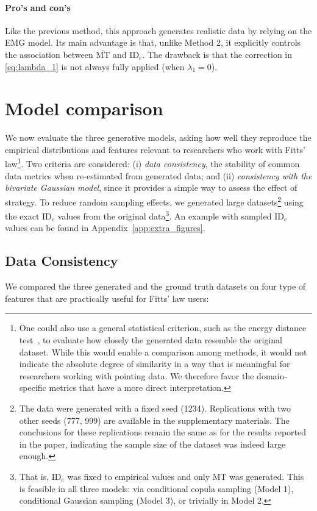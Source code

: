 \documentclass[acmlarge, manuscript,review]{acmart}
\newcommand{\mmt}{\ensuremath{\overline{\mt}}\xspace}
\newcommand{\mt}{\ensuremath{{\text{MT}}}\xspace}
\newcommand{\ide}{\ensuremath{{\text{ID}_e}}\xspace}
\begin{document}
\paragraph{Pro's and con's}
Like the previous method, this approach generates realistic data by relying on the EMG model. Its main advantage is that, unlike Method 2, it explicitly controls the association between \mmt and \ide. The drawback is that the correction in \autoref{eq:lambda_1} is not always fully applied (\ie when $\lambda_1 = 0$).

\section{Model comparison}
We now evaluate the three generative models, asking how well they reproduce the empirical distributions and features relevant to researchers who work with Fitts' law\footnote{One could also use a general statistical criterion, such as the energy distance test~\cite{szekely2004}, to evaluate how closely the generated data resemble the original dataset. While this would enable a comparison among methods, it would not indicate the absolute degree of similarity in a way that is meaningful for researchers working with pointing data. We therefore favor the domain-specific metrics that have a more direct interpretation.}. Two criteria are considered: (i) \textit{data consistency}, the stability of common data metrics when re-estimated from generated data; and (ii) \textit{consistency with the bivariate Gaussian model}, since it provides a simple way to assess the effect of strategy. To reduce random sampling effects, we generated large datasets\footnote{The data were generated with a fixed seed (1234). Replications with two other seeds (777, 999) are available in the supplementary materials. The conclusions for these replications remain the same as for the results reported in the paper, indicating the sample size of the dataset was indeed large enough.} using the exact \ide values from the original data\footnote{That is, \ide was fixed to empirical values and only MT was generated. This is feasible in all three models: via conditional copula sampling (Model 1), conditional Gaussian sampling (Model 3), or trivially in Model 2.}. An example with sampled \ide values can be found in Appendix~\ref{app:extra_figures}.

\subsection{Data Consistency \label{subs:consistency}}
We compared the three generated and the ground truth datasets on four type of features that are practically useful for Fitts' law users:
\end{document}
